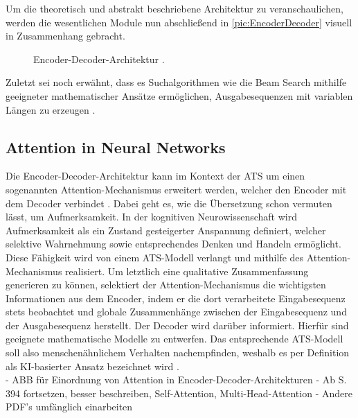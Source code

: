 \noindent
Um die theoretisch und abstrakt beschriebene Architektur zu veranschaulichen, werden die wesentlichen Module nun abschließend in \autoref{pic:EncoderDecoder} visuell in Zusammenhang gebracht.

\begin{figure}[h!]
  \centering
  \caption{Encoder-Decoder-Architektur \cite[S.~375]{ZHA20}.}
  \label{pic:EncoderDecoder}
\end{figure}

\noindent
Zuletzt sei noch erwähnt, dass es Suchalgorithmen wie die Beam Search mithilfe geeigneter mathematischer Ansätze ermöglichen, Ausgabesequenzen mit variablen Längen zu erzeugen \cite[S.~387]{ZHA20}.


\subsection{Attention in Neural Networks}
\noindent
Die Encoder-Decoder-Architektur kann im Kontext der \ac{ATS} um einen sogenannten Attention-Mechanismus erweitert werden, welcher den Encoder mit dem Decoder verbindet \cite{VAS17}. Dabei geht es, wie die Übersetzung schon vermuten lässt, um Aufmerksamkeit. In der kognitiven Neurowissenschaft wird Aufmerksamkeit als ein Zustand gesteigerter Anspannung definiert, welcher selektive Wahrnehmung sowie entsprechendes Denken und Handeln ermöglicht. Diese Fähigkeit wird von einem \ac{ATS}-Modell verlangt und mithilfe des Attention-Mechanismus realisiert. Um letztlich eine qualitative Zusammenfassung generieren zu können, selektiert der Attention-Mechanismus die wichtigsten Informationen aus dem Encoder, indem er die dort verarbeitete Eingabesequenz stets beobachtet und globale Zusammenhänge zwischen der Eingabesequenz und der Ausgabesequenz herstellt. Der Decoder wird darüber informiert. Hierfür sind geeignete mathematische Modelle zu entwerfen. Das entsprechende \ac{ATS}-Modell soll also menschenähnlichem Verhalten nachempfinden, weshalb es per Definition als KI-basierter Ansatz bezeichnet wird \cite[S.~389]{ZHA20}.\\

- ABB für Einordnung von Attention in Encoder-Decoder-Architekturen
- Ab S. 394 fortsetzen, besser beschreiben, Self-Attention, Multi-Head-Attention \cite{ZHA20}
- Andere PDF's umfänglich einarbeiten \cite{VAS17}


